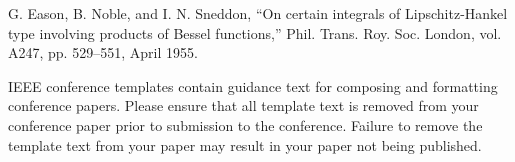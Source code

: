 \documentclass[conference]{IEEEtran}
\begin{document}


\begin{thebibliography}{00}
	 G. Eason, B. Noble, and I. N. Sneddon, ``On certain integrals of Lipschitz-Hankel type involving products of Bessel functions,'' Phil. Trans. Roy. Soc. London, vol. A247, pp. 529--551, April 1955.
\end{thebibliography}
\vspace{12pt}
\color{red}
IEEE conference templates contain guidance text for composing and formatting conference papers. Please ensure that all template text is removed from your conference paper prior to submission to the conference. Failure to remove the template text from your paper may result in your paper not being published.
\end{document}
